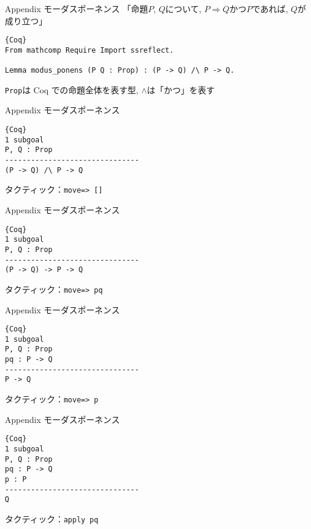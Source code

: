 \documentclass[dvipdfmx,cjk]{beamer}
\theoremstyle{mystyle}
\newcommand{\Lra}{\Longrightarrow}
\newcommand{\0}{\textbf{0}}
\begin{document}
\begin{frame}[fragile]{Appendix モーダスポーネンス}
	「命題$P$, $Q$について, $P \Lra Q$かつ$P$であれば, $Q$が成り立つ」 \pause
	\begin{lstlisting}{Coq}
From mathcomp Require Import ssreflect.

Lemma modus_ponens (P Q : Prop) : (P -> Q) /\ P -> Q. \end{lstlisting} \pause
	{\tt Prop}は Coq での命題全体を表す型, $\wedge$は「かつ」を表す
\end{frame}

\begin{frame}[fragile]{Appendix モーダスポーネンス}
	\begin{screen}
	  \begin{lstlisting}{Coq}
1 subgoal
P, Q : Prop
-------------------------------
(P -> Q) /\ P -> Q \end{lstlisting}
	\end{screen} \pause
	タクティック：{\tt move=> []}
\end{frame}

\begin{frame}[fragile]{Appendix モーダスポーネンス}
	\begin{screen}
	  \begin{lstlisting}{Coq}
1 subgoal
P, Q : Prop
-------------------------------
(P -> Q) -> P -> Q \end{lstlisting}
	\end{screen} \pause
	タクティック：{\tt move=> pq}
\end{frame}

\begin{frame}[fragile]{Appendix モーダスポーネンス}
	\begin{screen}
	  \begin{lstlisting}{Coq}
1 subgoal
P, Q : Prop
pq : P -> Q
-------------------------------
P -> Q \end{lstlisting}
	\end{screen} \pause
	タクティック：{\tt move=> p}
\end{frame}

\begin{frame}[fragile]{Appendix モーダスポーネンス}
	\begin{screen}
	  \begin{lstlisting}{Coq}
1 subgoal
P, Q : Prop
pq : P -> Q
p : P
-------------------------------
Q \end{lstlisting}
	\end{screen} \pause
	タクティック：{\tt apply pq}
\end{frame}
\end{document}

